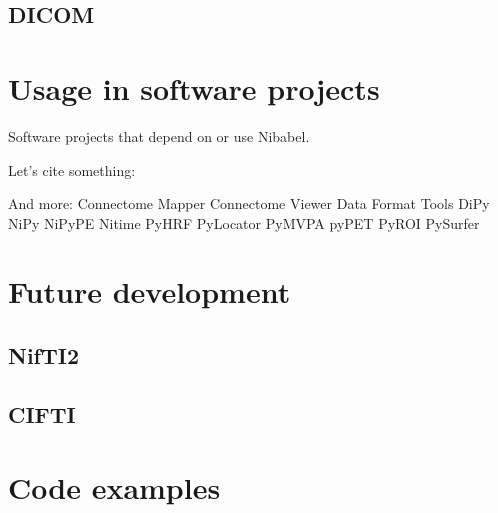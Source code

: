 \documentclass[twoside=false,fontsize=11pt,pointednumbers,normalheadings,%
               abstracton,paper=a4,pagesize,pdftex]{scrartcl}
\begin{document}
\subsection{DICOM}


\section{Usage in software projects}

Software projects that depend on or use Nibabel.

Let's cite something: \citet{HHS+09b}

And more:
Connectome Mapper
Connectome Viewer
Data Format Tools
DiPy
NiPy
NiPyPE
Nitime
PyHRF
PyLocator
PyMVPA
pyPET
PyROI
PySurfer

\section{Future development}

\subsection{NifTI2}

\subsection{CIFTI}


\section{Code examples}


%


\end{document}
